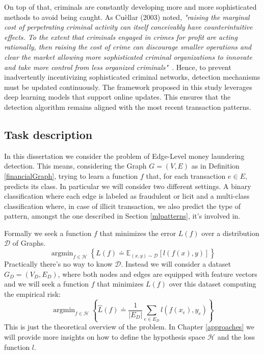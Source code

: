 On top of that, criminals are constantly developing more and more sophisticated methods to avoid being caught. 
As Cuèllar (2003) noted, \textit{"raising the marginal cost of perpetrating criminal activity can itself conceivably have counterintuitive effects. To the extent that criminals engaged in crimes for profit are acting rationally, then raising the cost of crime can discourage smaller operations and clear the market allowing more sophisticated criminal organizations to innovate and take more control from less organized criminals"}~\cite{cuellar2003tenuous}. 
Hence, to prevent inadvertently incentivizing sophisticated criminal networks, detection mechanisms must be updated continuously. The framework proposed in this study leverages deep learning models that support online updates. This ensures that the detection algorithm remains aligned with the most recent transaction patterns.

\subsection{Task description}
\label{task}
In this dissertation we consider the problem of Edge-Level money laundering detection. This means, considering the Graph $G = (V, E)$ as in Definition \ref{financialGraph}, trying to learn a function \(f\) that, for each transaction $e \in E$, predicts its class. In particular we will consider two different settings. A binary classification where each edge is labeled as fraudulent or licit and a multi-class classification where, in case of illicit transaction, we also predict the type of pattern, amongst the one described in Section \ref{mlpatterns}, it's involved in.

Formally we seek a function \(f\) that minimizes the error \(L(f)\) over a distribution \(\mathcal{D}\) of Graphs.
\begin{equation}
    \operatorname{argmin}_{f \in \mathcal{H}} \left\{L(f) \doteq \mathbb{E}_{(x,y) \sim \mathcal{D}} [l(f(x), y)]\right\}
\end{equation}
Practically there's no way to know \(\mathcal{D}\). Instead we will consider a dataset \(G_D = (V_D, E_D)\), where both nodes and edges are equipped with feature vectors and we will seek a function \(f\) that minimizes \(L(f)\) over this dataset computing the empirical risk:
\begin{equation}
    \operatorname{argmin}_{f \in \mathcal{H}} \left\{\hat{L}(f) \doteq \frac{1}{|E_D|} \sum_{e \in E_D} l(f(x_e), y_e)\right\}
\end{equation}
This is just the theoretical overview of the problem. In Chapter \ref{approaches} we will provide more insights on how to define the hypothesis space \(\mathcal{H}\) and the loss function \(l\). 

